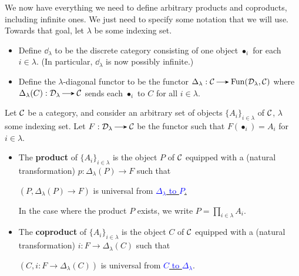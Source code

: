     We now have everything we need to define arbitrary products and coproducts, including 
    infinite ones.
    We just need to specify some notation that we will use.
    Towards that goal, let $\lambda$ be some indexing set.  
    \begin{itemize}
        \item Define $\dd_{\lambda}$ to be the discrete category consisting of one object $\bullet_i$ for each $i \in 
        \lambda$. (In particular, $\dd_{\lambda}$ is now possibly infinite.)
        \item Define the $\lambda$-diagonal functor to be the functor $\Delta_{\lambda}: \cc \to \text{Fun}(\dd_{\lambda}, \cc)$
        where $\Delta_{\lambda}(C): \dd_{\lambda} \to \cc$ 
        sends each $\bullet_i$ to $C$ for all $i \in \lambda$.
    \end{itemize}

    \begin{definition}\label{definition:infinite_products_and_coproducts}
        Let $\mathcal{C}$ be a category, and consider an arbitrary set of objects $\{A_i\}_{i \in \lambda}$ of $\mathcal{C}$, $\lambda$ some indexing set.
        Let $F: \dd_{\lambda} \to \cc$ be the functor such that $F(\bullet_{i}) = A_i$ for $i \in \lambda$.

        \begin{itemize}
            \item The \textbf{product} of $\{A_i\}_{i \in \lambda}$ is the object 
            $P$ of $\mathcal{C}$
            equipped with a (natural transformation) $\displaystyle p: \Delta_{\lambda}\left( P\right) \to F$ 
            such that 
            \begin{center}
                $\left( P, \Delta_{\lambda}\left( P \right) \to F \right)$ is universal from 
                \hyperref[definition:universal_morphism_from_F_to_D]{\textcolor{blue}{$\Delta_{\lambda}$ to $P$}.}
            \end{center}
            In the case where the product $P$ exists, we write $P = \prod_{i \in \lambda}A_i.$

            \item The \textbf{coproduct} of $\{A_i\}_{i \in \lambda}$ is the object 
            $C$ of $\mathcal{C}$ equipped with a (natural transformation) $i: F \to \Delta_{\lambda}(C)$
            such that 
            \begin{center}
                $(C, i:  F \to \Delta_{\lambda}(C))$ is universal from 
                \hyperref[definition:universal_morphism_from_D_to_F]{\textcolor{blue}{$C$ to $\Delta_{\lambda}$}}.
            \end{center}
        \end{itemize}
    \end{definition}

